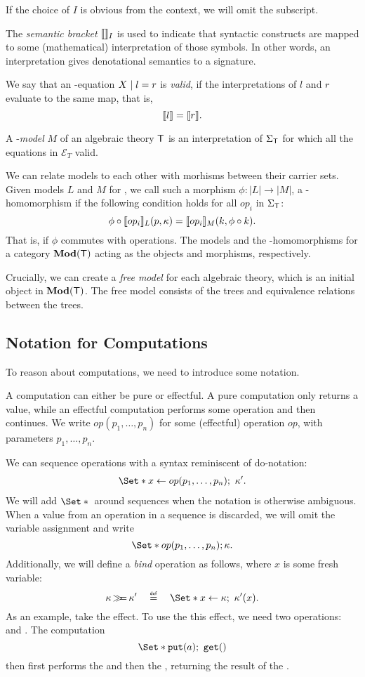 If the choice of $I$ is obvious from the context, we will omit the subscript.

The \emph{semantic bracket} $\llbracket\rrbracket_I$ is used to indicate that syntactic constructs are mapped to some (mathematical) interpretation of those symbols. In other words, an interpretation gives denotational semantics to a signature.

\begin{definition}[Model]
    We say that an \Sig-equation $X \;|\; l = r$ is \emph{valid}, if the interpretations of $l$ and $r$ evaluate to the same map, that is,
    \[ \llbracket l\rrbracket = \llbracket r\rrbracket. \]

    A \T-\emph{model} $M$ of an algebraic theory $\mathsf{T}$ is an interpretation of $\Sigma_\mathsf{T}$ for which all the equations in $\mathcal{E}_T$ valid.
\end{definition}

We can relate models to each other with morhisms between their carrier sets. Given models $L$ and $M$ for \T, we call such a morphism $\phi : |L| \to |M|$, a \T-homomorphism if the following condition holds for all $op_i$ in $\Sigma_\mathsf{T}$:
\[ \phi \circ \llbracket op_i\rrbracket_L(p, \kappa) = \llbracket op_i\rrbracket_M(k, \phi \circ k). \]
That is, if $\phi$ commutes with operations. The models and the \T-homomorphisms for a category $\mathbf{Mod}(\mathsf{T})$ acting as the objects and morphisms, respectively.

Crucially, we can create a \emph{free model} for each algebraic theory, which is an initial object in $\mathbf{Mod}(\mathsf{T})$. The free model consists of the trees and equivalence relations between the trees.

\subsection{Notation for Computations}

To reason about computations, we need to introduce some notation.

A computation can either be pure or effectful. A pure computation only returns a value, while an effectful computation performs some operation and then continues. We write $op(p_1, \dots, p_n)$ for some (effectful) operation $op$, with parameters $p_1,\dots,p_n$.

We can sequence operations with a syntax reminiscent of do-notation:
\begin{align*}
    \S{x \gets op(p_1,\dots,p_n)\seq \kappa'}.
\end{align*}
We will add $\S{}$ around sequences when the notation is otherwise ambiguous. When a value from an operation in a sequence is discarded, we will omit the variable assignment and write 
\[ \S{op(p_1,\dots,p_n); \kappa}. \]
Additionally, we will define a \emph{bind} operation \bind as follows, where $x$ is some fresh variable:
\[ 
    \kappa \bind \kappa' \quad\defeq\quad \S{x \gets \kappa\seq \kappa'(x)}.
\]
As an example, take the  effect. To use the this effect, we need two operations:  and . The computation
\[ \S{\oput(a)\seq \oget()} \]
then first performs the \oput and then the \oget, returning the result of the \oget.

